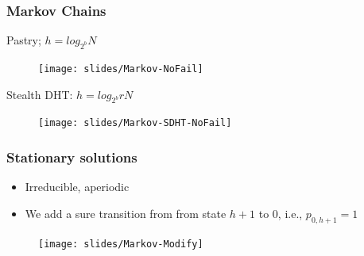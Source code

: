 \documentclass[xcolor=pdftex,dvipsnames,table]{beamer}
\begin{document}
\begin{frame}
\frametitle{Markov Chains}
\begin{block}{Pastry; \textbf{$h = log_{2^b}N$}}
  \begin{center}
    \begin{figure}%
        \texttt{[image: slides/Markov-NoFail]}
    \end{figure}
  \end{center}
\end{block}
\begin{block}{Stealth DHT: \textbf{$h = log_{2^b}rN$}}
  \begin{center}
    \begin{figure}%
        \texttt{[image: slides/Markov-SDHT-NoFail]}
    \end{figure}
  \end{center}
\end{block}
\end{frame}


\begin{frame}
\frametitle{Stationary solutions}

   \begin{itemize}
        \item Irreducible, aperiodic
        \item We add a sure transition from from state $h+1$ to $0$,
        i.e., $p_{0,h+1}=1$
    \end{itemize}

    \begin{center}
    \begin{figure}%
        \texttt{[image: slides/Markov-Modify]}
    \end{figure}
  \end{center}

\end{frame}
\end{document}
